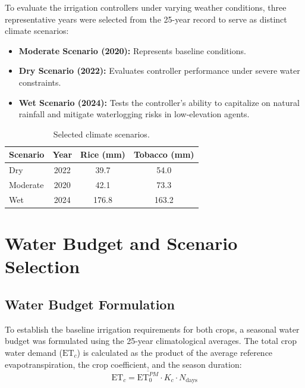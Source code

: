 To evaluate the irrigation controllers under varying weather conditions, three representative years were selected from the 25-year record to serve as distinct climate scenarios:


\begin{itemize}
    \item \textbf{Moderate Scenario (2020):} Represents baseline conditions.
    \item \textbf{Dry Scenario (2022):} Evaluates controller performance under severe water constraints.
    \item \textbf{Wet Scenario (2024):} Tests the controller's ability to capitalize on natural rainfall and mitigate waterlogging risks in low-elevation agents.
\end{itemize}

\begin{table}[H]
\centering
\caption{Selected climate scenarios.}
\begin{tabular}{lccc}
\toprule
\textbf{Scenario} & \textbf{Year} & \textbf{Rice (mm)} & \textbf{Tobacco (mm)} \\
\midrule
Dry & 2022 & 39.7 & 54.0 \\
Moderate & 2020 & 42.1 & 73.3 \\
Wet & 2024 & 176.8 & 163.2 \\
\bottomrule
\end{tabular}
\end{table}



\section{Water Budget and Scenario Selection}
\label{sec:water_budget}

\subsection{Water Budget Formulation}

To establish the baseline irrigation requirements for both crops, a seasonal water budget was formulated using the 25-year climatological averages. The total crop water demand ($\text{ET}_c$) is calculated as the product of the average reference evapotranspiration, the crop coefficient, and the season duration:
\begin{equation}
    \text{ET}_c = \overline{\text{ET}_0^{PM}} \cdot K_c \cdot N_{\text{days}}
\end{equation}

